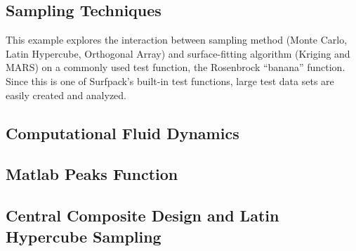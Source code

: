 \documentclass{article}
\begin{document}
\pagebreak
\subsection {Sampling Techniques}

This example explores the interaction between sampling method (Monte Carlo, Latin Hypercube, Orthogonal Array) and surface-fitting algorithm (Kriging and MARS) on a commonly used test function, the Rosenbrock ``banana'' function.  Since this is one of Surfpack's built-in test functions, large test data sets are easily created and analyzed.

\begin{figure}[htbp]
  \centering
  \begin{bigbox}
	\begin{small}
	
 	\end{small}
  \end{bigbox}
   \label{fig:sampling}
\end{figure}

\pagebreak
\subsection {Computational Fluid Dynamics}

\begin{figure}[htbp]
  \centering
  \begin{bigbox}
	\begin{small}
	
 	\end{small}
  \end{bigbox}
   \label{fig:cfd}
\end{figure}

\pagebreak
\subsection {Matlab Peaks Function}

\begin{figure}[htbp]
  \centering
  \begin{bigbox}
	\begin{small}
	
 	\end{small}
  \end{bigbox}
   \label{fig:peaks}
\end{figure}

\pagebreak
\subsection {Central Composite Design and Latin Hypercube Sampling}
\end{document}

